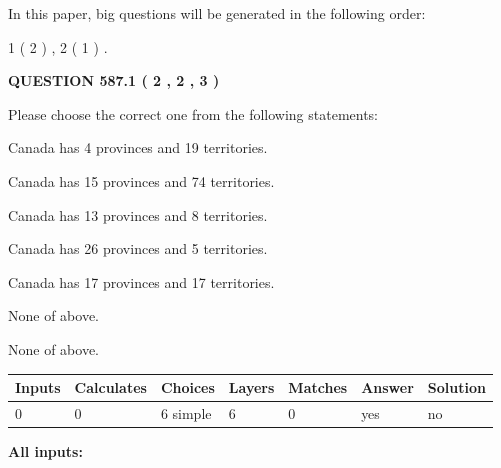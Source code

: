 \documentclass[12pt]{article}
\begin{document}
\vspace{0.2in}
   
In this paper, big questions will be generated in the following order: 
   
   
   1 ( 2 )
 ,
   2 ( 1 )
 .
  
\vspace{0.2in}
  
{\textbf{\Large{QUESTION
587.1 
 ( 2 , 2 , 3 )
}}}
  
  
Please choose the correct one from the following statements:
 
 
Canada has   4 provinces and  19 territories.
 
 
Canada has  15 provinces and  74 territories.
 
 
Canada has  13 provinces and  8 territories.
 
 
Canada has  26 provinces and  5 territories.
 
 
Canada has  17 provinces and  17 territories.
 
 
 None of above.
 
 
\noindent{}
 
 
 None of above.
 
 
\noindent{}
 
 
   
   
   
   
\noindent\begin{tabular}{|l|l|l|l|l|l|l|}
 \hline
Inputs & Calculates & Choices & Layers & Matches & Answer & Solution \\ \hline
 0  & 
 0  & 
 6
  simple  
  & 
 6  & 
 0  & 
  yes & 
  no 
  \\ \hline
 \end{tabular}
   
   
   
   
\noindent{}
   
   
   
   
\noindent\vspace{0.1in}\hspace{-0.08in} {\textbf{\Large{All inputs: }}}
   
\end{document}
